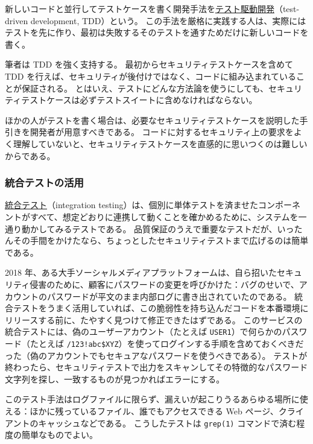 \documentclass[uplatex]{jsarticle}
\def\label#1{}%
\begin{document}
\begin{dfn}[テスト駆動開発]\label{dfn:ch12-tdd}
新しいコードと並行してテストケースを書く開発手法を\underline{テスト駆動開発}（test-driven development, TDD）という。
この手法を厳格に実践する人は、実際にはテストを先に作り、最初は失敗するそのテストを通すためだけに新しいコードを書く。
\end{dfn}

筆者は TDD を強く支持する。
最初からセキュリティテストケースを含めて TDD を行えば、セキュリティが後付けではなく、コードに組み込まれていることが保証される。
とはいえ、テストにどんな方法論を使うにしても、セキュリティテストケースは必ずテストスイートに含めなければならない。

ほかの人がテストを書く場合は、必要なセキュリティテストケースを説明した手引きを開発者が用意すべきである。
コードに対するセキュリティ上の要求をよく理解していないと、セキュリティテストケースを直感的に思いつくのは難しいからである。

\subsubsection{統合テストの活用}

\underline{統合テスト}（integration testing）は、個別に単体テストを済ませたコンポーネントがすべて、想定どおりに連携して動くことを確かめるために、システムを一通り動かしてみるテストである。
品質保証のうえで重要なテストだが、いったんその手間をかけたなら、ちょっとしたセキュリティテストまで広げるのは簡単である。

\begin{exa}[ログへのパスワード流出]\label{exa:ch12-password-log-leak}
2018 年、ある大手ソーシャルメディアプラットフォームは、自ら招いたセキュリティ侵害のために、顧客にパスワードの変更を呼びかけた：バグのせいで、アカウントのパスワードが平文のまま内部ログに書き出されていたのである。
統合テストをうまく活用していれば、この脆弱性を持ち込んだコードを本番環境にリリースする前に、たやすく見つけて修正できたはずである。
このサービスの統合テストには、偽のユーザーアカウント（たとえば \texttt{USER1}）で何らかのパスワード（たとえば \texttt{/123!abc\$XYZ}）を使ってログインする手順を含めておくべきだった（偽のアカウントでもセキュアなパスワードを使うべきである）。
テストが終わったら、セキュリティテストで出力をスキャンしてその特徴的なパスワード文字列を探し、一致するものが見つかればエラーにする。
\end{exa}

このテスト手法はログファイルに限らず、漏えいが起こりうるあらゆる場所に使える：ほかに残っているファイル、誰でもアクセスできる Web ページ、クライアントのキャッシュなどである。
こうしたテストは \texttt{grep(1)} コマンドで済む程度の簡単なものでよい。
\end{document}
